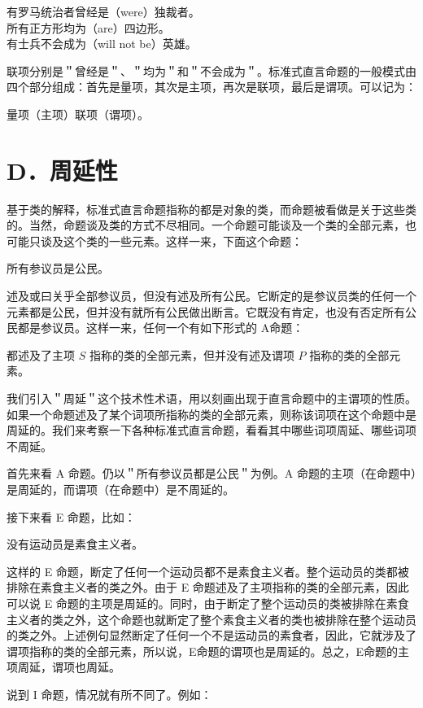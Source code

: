 \begin{displayquote}
有罗马统治者曾经是（were）独裁者。\\
所有正方形均为（are）四边形。\\
有士兵不会成为（will not be）英雄。
\end{displayquote}

联项分别是＂曾经是＂、＂均为＂和＂不会成为＂。标准式直言命题的一般模式由四个部分组成：首先是量项，其次是主项，再次是联项，最后是谓项。可以记为：

量项（主项）联项（谓项）。

\section*{D．周延性}
基于类的解释，标准式直言命题指称的都是对象的类，而命题被看做是关于这些类的。当然，命题谈及类的方式不尽相同。一个命题可能谈及一个类的全部元素，也可能只谈及这个类的一些元素。这样一来，下面这个命题：

\begin{displayquote}
所有参议员是公民。
\end{displayquote}

述及或曰关乎全部参议员，但没有述及所有公民。它断定的是参议员类的任何一个元素都是公民，但并没有就所有公民做出断言。它既没有肯定，也没有否定所有公民都是参议员。这样一来，任何一个有如下形式的 A命题：

都述及了主项 $S$ 指称的类的全部元素，但并没有述及谓项 $P$ 指称的类的全部元素。

我们引入＂周延＂这个技术性术语，用以刻画出现于直言命题中的主谓项的性质。如果一个命题述及了某个词项所指称的类的全部元素，则称该词项在这个命题中是周延的。我们来考察一下各种标准式直言命题，看看其中哪些词项周延、哪些词项不周延。

首先来看 A 命题。仍以＂所有参议员都是公民＂为例。A 命题的主项（在命题中）是周延的，而谓项（在命题中）是不周延的。

接下来看 E 命题，比如：

没有运动员是素食主义者。

这样的 E 命题，断定了任何一个运动员都不是素食主义者。整个运动员的类都被排除在素食主义者的类之外。由于 E 命题述及了主项指称的类的全部元素，因此可以说 E 命题的主项是周延的。同时，由于断定了整个运动员的类被排除在素食主义者的类之外，这个命题也就断定了整个素食主义者的类也被排除在整个运动员的类之外。上述例句显然断定了任何一个不是运动员的素食者，因此，它就涉及了谓项指称的类的全部元素，所以说，E命题的谓项也是周延的。总之，E命题的主项周延，谓项也周延。

说到 I 命题，情况就有所不同了。例如：

